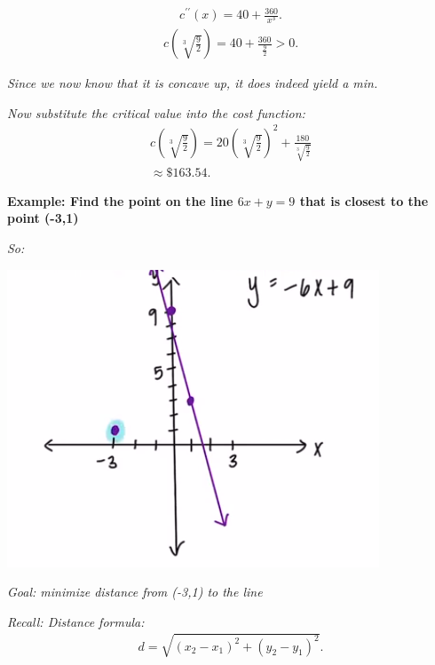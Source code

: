 \documentclass{report}
\begin{document}
 \begin{align*}
   c^{\prime\prime}(x) = 40 +\frac{360}{x^{3}}
 .\end{align*}
 \begin{align*}
   c(\sqrt[3]{\frac{9}{2}}) = 40 + \frac{360}{\frac{9}{2}} > 0
 .\end{align*}

 \bigbreak \noindent 
 \textit{Since we now know that it is concave up, it does indeed yield a min.}
 
 \bigbreak \noindent 
 \textit{Now substitute the critical value into the cost function:}
 \begin{align*}
   c(\sqrt[3]{\frac{9}{2}}) = 20(\sqrt[3]{\frac{9}{2}})^{2} + \frac{180}{\sqrt[3]{\frac{9}{2}}} \\
   \boxed{\approx \$163.54}
 .\end{align*}

 \bigbreak \noindent 
 \begin{mdframed}
   \textbf{Example: Find the point on the line $6x+y=9$ that is closest to the point (-3,1)}
 \end{mdframed}

 \bigbreak \noindent
 \textit{So:}
 \bigbreak \noindent 
 \begin{center}
   \includegraphics[scale=0.8]{ ./images/23.png }
 \end{center}

 \bigbreak \noindent 
 \textit{Goal: minimize distance from (-3,1) to the line}

 \bigbreak \noindent 
 \textit{Recall: Distance formula:}
 \begin{align*}
   d = \sqrt{(x_2 -x_1)^{2}+(y_2-y_1)^{2}}
 .\end{align*}
\end{document}
